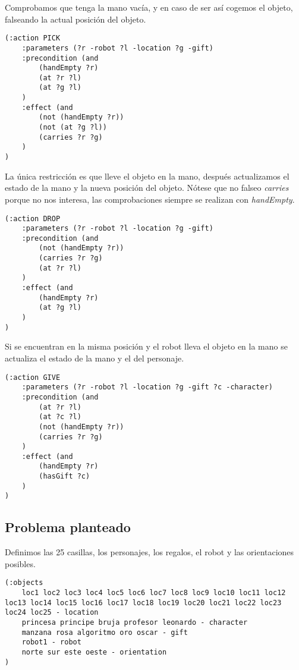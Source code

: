 \documentclass{article}
\begin{document}
Comprobamos que tenga la mano vacía, y en caso de ser así cogemos el objeto, falseando la actual posición del objeto.

\begin{lstlisting}
(:action PICK
    :parameters (?r -robot ?l -location ?g -gift)
    :precondition (and 
        (handEmpty ?r)
        (at ?r ?l)
        (at ?g ?l)
    )
    :effect (and 
        (not (handEmpty ?r))
        (not (at ?g ?l))
        (carries ?r ?g)
    )
)
\end{lstlisting}

La única restricción es que lleve el objeto en la mano, después actualizamos el estado de la mano y la nueva posición del objeto. Nótese que no falseo \emph{carries} porque no nos interesa, las comprobaciones siempre se realizan con \emph{handEmpty}.

\begin{lstlisting}
(:action DROP
    :parameters (?r -robot ?l -location ?g -gift)
    :precondition (and 
        (not (handEmpty ?r))
        (carries ?r ?g)
        (at ?r ?l)
    )
    :effect (and 
        (handEmpty ?r)
        (at ?g ?l)
    )
)
\end{lstlisting}

Si se encuentran en la misma posición y el robot lleva el objeto en la mano se actualiza el estado de la mano y el del personaje.

\begin{lstlisting}
(:action GIVE
    :parameters (?r -robot ?l -location ?g -gift ?c -character)
    :precondition (and 
        (at ?r ?l)
        (at ?c ?l)
        (not (handEmpty ?r))
        (carries ?r ?g)
    )
    :effect (and 
        (handEmpty ?r)
        (hasGift ?c)
    )
)
\end{lstlisting}

\subsection{Problema planteado}

Definimos las 25 casillas, los personajes, los regalos, el robot y las orientaciones posibles.

\begin{lstlisting}
(:objects 
    loc1 loc2 loc3 loc4 loc5 loc6 loc7 loc8 loc9 loc10 loc11 loc12 loc13 loc14 loc15 loc16 loc17 loc18 loc19 loc20 loc21 loc22 loc23 loc24 loc25 - location
    princesa principe bruja profesor leonardo - character
    manzana rosa algoritmo oro oscar - gift
    robot1 - robot
    norte sur este oeste - orientation
)
\end{lstlisting}
\end{document}
